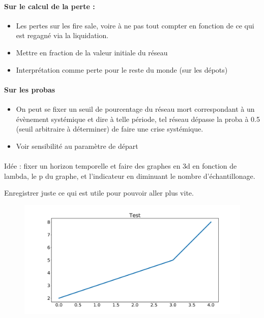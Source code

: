 \documentclass{article}
\begin{document}
\begin{appendices}
\paragraph{Sur le calcul de la perte :}
\begin{itemize}
\item Les pertes sur les fire sale, voire à ne pas tout compter en fonction de ce qui est regagné via la liquidation.
\item Mettre en fraction de la valeur initiale du réseau
\item Interprétation comme perte pour le reste du monde (sur les dépots)
\end{itemize}

\paragraph{Sur les probas}

\begin{itemize}
\item On peut se fixer un seuil de pourcentage du réseau mort correspondant à un évènement systémique et dire à telle période, tel réseau dépasse la proba à 0.5 (seuil arbitraire à déterminer) de faire une crise systémique.
\item Voir sensibilité au paramètre de départ

\end{itemize}


\paragraph{}

Idée : fixer un horizon temporelle et faire des graphes en 3d en fonction de lambda, le p du graphe, et l'indicateur en diminuant le nombre d'échantillonage.

Enregistrer juste ce qui est utile pour pouvoir aller plus vite.

\begin{figure}
  \centering
  \includegraphics[scale=0.3]{Figure_1.pdf}
\end{figure}

\end{appendices}

\printbibliography
\end{document}

